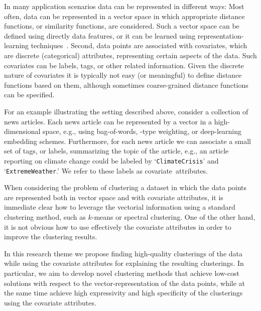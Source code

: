 \documentclass[a4paper,11pt]{article}
\begin{document}
In many application scenarios data can be represented in different ways: 
Most often, data can be represented in a vector space
in which appropriate distance functions, or similarity functions, are considered.
Such a vector space can be defined using directly data features, 
or it can be learned using representation-learning techniques~\cite{hamilton2017representation,wang2020survey}.
Second, data points are associated with covariates, 
which are discrete (categorical) attributes, 
representing certain aspects of the data. 
Such covariates can be labels, tags, or other related information.
Given the discrete nature of covariates it is typically not easy (or meaningful)
to define distance functions based on them, 
although sometimes coarse-grained distance functions can be specified.

For an example illustrating the setting described above, 
consider a collection of news articles. 
Each news article can be represented by a vector in a high-dimensional space, 
e.g., using bag-of-words, \tfidf-type weighting, or deep-learning embedding schemes. 
Furthermore, for each news article we can associate a small 
set of tags, or labels, summarizing the topic of the article, 
e.g., an article reporting on climate change could be labeled by
`\texttt{\small ClimateCrisis}' and `\texttt{\small ExtremeWeather}.'
We refer to these labels as covariate~attributes.

When considering the problem of clustering a dataset in which the data points are 
represented both in vector space and with covariate attributes, 
it is immediate clear how to leverage the vectorial information
using a standard clustering method, such as $k$-means or spectral clustering. 
One of the other hand, it is not obvious how to use effectively the 
covariate attributes in order to improve the clustering results. 

In this research theme we propose finding high-quality clusterings of the data
while using the covariate attributes for explaining the resulting clusterings. 
In particular, we aim to develop novel clustering methods
that achieve low-cost solutions with respect to the vector-representation of the data points, 
while at the same time achieve high expressivity and high specificity of the clusterings
using the covariate attributes. 
\end{document}
